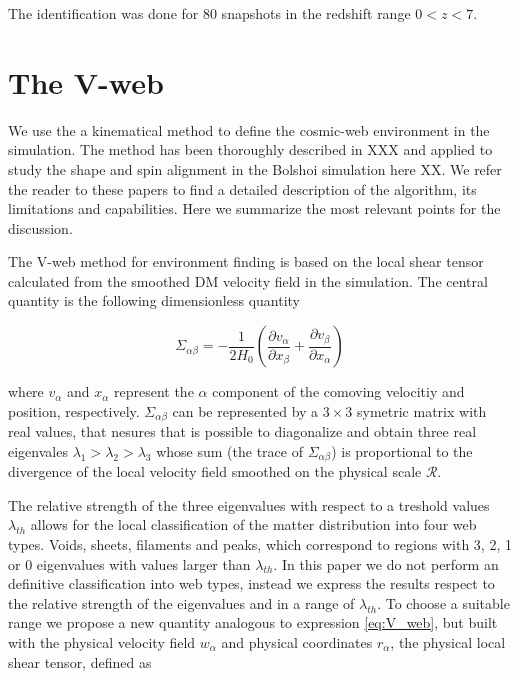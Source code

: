 \documentclass[usenatbib]{mn2e}
\newcommand{\pr}[1]{ \left( #1 \right) }
\newcommand{\eq}[2]{\begin{equation} \label{eq:#1} #2 \end{equation}}
\begin{document}
The identification was done for 80 snapshots in the redshift range $0<z<7$.

\section{The V-web}
\label{sec:Vweb}

We use the a kinematical method to define the cosmic-web environment in the simulation. The method has
been thoroughly described in XXX and applied to study the shape and spin alignment in the Bolshoi 
simulation here XX. We refer the reader to these papers to find a detailed description of the algorithm,
its limitations and capabilities. Here we summarize the most relevant points for the discussion.

The V-web method for environment finding is based on the local shear tensor calculated from the smoothed 
DM velocity field in the simulation. The central quantity is the following dimensionless quantity

\eq{V_web}
{
\Sigma_{\alpha\beta} = -\frac{1}{2H_0}\pr{\frac{\partial v_{\alpha}}{\partial x_{\beta}}+\frac{\partial v_{\beta}}{\partial x_{\alpha}}}
}

where $v_{\alpha}$ and $x_{\alpha}$ represent the $\alpha$ component of the comoving velocitiy and 
position, respectively. $\Sigma_{\alpha\beta}$ can be represented by a $3\times 3$ symetric matrix with 
real values, that nesures that is possible to diagonalize and obtain three real eigenvales 
$\lambda_{1} > \lambda_{2}>\lambda_3$ whose sum (the trace of $\Sigma_{\alpha\beta}$) is proportional to 
the divergence of the local velocity field smoothed on the physical scale ${\mathcal R}$. 

The relative strength of the three eigenvalues with respect to a treshold values $\lambda_{th}$ allows 
for the local classification of the matter distribution into four web types. Voids, sheets, filaments 
and peaks, which correspond to regions with 3, 2, 1 or 0 eigenvalues with values larger than 
$\lambda_{th}$. In this paper we do not perform an definitive classification into web types, instead
we express the results respect to the relative strength of the eigenvalues and in a range of
 $\lambda_{th}$. To choose a suitable range we propose a new quantity analogous to expression 
\ref{eq:V_web}, but built with the physical velocity field $w_{\alpha}$ and physical coordinates 
$r_{\alpha}$, the physical local shear tensor, defined as
\end{document}
